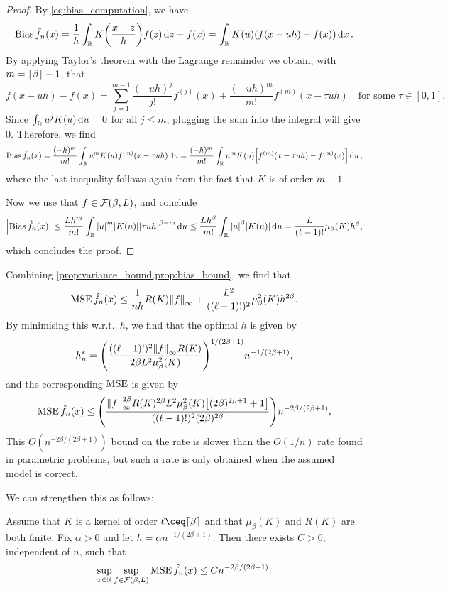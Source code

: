 \begin{proof}
	By \cref{eq:bias_computation}, we have 
	\[
	\operatorname{Bias} \hat f_n(x) = \frac1h \int_\mathbb R K\qty(\frac{x - z}{h}) f(z) \dd{z} - f(x) = \int_\mathbb R K(u)\qty( f(x - uh) - f(x)) \dd{x}. 
	\]
	By applying Taylor's theorem with the Lagrange remainder we obtain, with $m = \lceil\beta\rceil - 1$, that
	\[
	f(x - uh) - f(x) = \sum_{j=1}^{m-1} \frac{(-uh)^j}{j!} f^{(j)}(x) + \frac{(-uh)^m}{m!} f^{(m)}(x - \tau u h) \quad\text{for some $\tau \in [0, 1]$}. 
	\]
	Since $\int_\mathbb R u^j K(u) \dd{u} = 0$ for all $j \leq m$, plugging the sum into the integral will give 0. Therefore, we find
	\[
	\operatorname{Bias} \hat f_n(x) =  \frac{(-h)^m}{m!} \int_\mathbb R u^m K(u) f^{(m)}(x - \tau uh) \dd{u} = \frac{(-h)^m}{m!} \int_\mathbb R u^m K(u) \qty[f^{(m)}(x - \tau uh)
- f^{(m)}(x)] \dd{u},	\]
	where the last inequality follows again from the fact that $K$ is of order $m + 1$. 
	
	Now we use that $f \in \mathcal F(\beta, L)$, and conclude
	\[
	\abs{\operatorname{Bias} \hat f_n(x)} \leq \frac{Lh^m}{m!} \int_\mathbb R \abs{u}^m \abs{K(u)} \abs{\tau u h}^{\beta - m} \dd{u} \leq \frac{Lh^\beta}{m!} \int_\mathbb R \abs{u}^\beta \abs{K(u)} \dd{u} = \frac{L}{(\ell - 1)!} \mu_\beta(K) h^\beta,
	\]	
	which concludes the proof. 
\end{proof}

Combining \cref{prop:variance_bound,prop:bias_bound}, we find that
\[
\operatorname{MSE} \hat f_n(x) \leq \frac{1}{nh} R(K) \norm{f}_\infty + \frac{L^2}{((\ell - 1)!)^2} \mu^2_\beta(K) h^{2\beta}. 
\]
By minimising this w.r.t.\ $h$, we find that the optimal $h$ is given by
\[
h_n^* = \qty(\frac{((\ell - 1)!)^2 \norm{f}_\infty R(K)}{2\beta L^2 \mu_\beta^2(K)})^{1/(2\beta + 1)} n^{-1/(2\beta + 1)}, 
\]
and the corresponding $\operatorname{MSE}$ is given by
\[
\operatorname{MSE} \hat f_n(x) \leq \qty(\frac{\norm{f}_\infty^{2\beta} R(K)^{2\beta} L^2 \mu_\beta^2(K) \qty[(2\beta)^{2\beta + 1} + 1]}{((\ell - 1)!)^2 (2\beta)^{2\beta}}) n^{-2\beta/(2\beta + 1)},
\]
This $O(n^{-2\beta/(2\beta + 1)})$ bound on the rate is slower than the $O(1/n)$ rate found in parametric problems, but such a rate is only obtained when the assumed model is correct. 

We can strengthen this as follows:
\begin{theorem}
	Assume that $K$ is a kernel of order $\ell \ceq \ceil{\beta}$ and that $\mu_\beta(K)$ and $R(K)$ are both finite. Fix $\alpha > 0$ and let $h = \alpha n^{-1/(2\beta + 1)}$. Then there exists $C > 0$, independent of $n$, such that
	\[
	\sup_{x \in \mathbb R} \sup_{f \in \mathcal F(\beta, L)} \operatorname{MSE} \hat f_n(x) \leq C n^{-2\beta/(2\beta + 1)}. 
	\]
\end{theorem}

